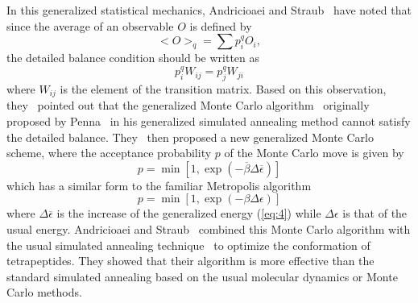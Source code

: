 In this generalized statistical mechanics, Andricioaei and 
Straub~\cite{AS1} have noted that since the average of an 
observable $O$ is defined by 
\begin{equation}
<O>_{q}=\sum p_{i}^{q}O_{i},
\label{eq:6}
\end{equation}
the detailed balance condition should be written as 
\begin{equation}
p_{i}^{q}W_{ij}=p_{j}^{q}W_{ji}
\label{equation}
\end{equation}
where $W_{ij}$ is the element of the transition matrix. Based 
on this observation, they~\cite{AS1} pointed out that the 
generalized Monte Carlo algorithm~\cite{TS} originally proposed 
by Penna~\cite{Pe} in his generalized simulated annealing method 
cannot satisfy the detailed balance.  They~\cite{AS1} then 
proposed a new generalized Monte Carlo scheme, where the 
acceptance probability $p$ of the Monte Carlo move is given by
\begin{equation}
p=\min\left[1,\exp(-\overline{\beta}\Delta \overline{\epsilon})\right] 
\label{eq:7}
\end{equation}
which has a similar form to the familiar Metropolis 
algorithm~\cite{MRRTT} 
\begin{equation}
p=\min\left[1,\exp(-\beta\Delta \epsilon)\right] \label{eq:8}
\end{equation}
where $\Delta\overline{\epsilon}$ is the increase of the 
generalized energy (\ref{eq:4}) while $\Delta\epsilon$ is that 
of the usual energy. Andricioaei and Straub~\cite{AS1} combined 
this Monte Carlo algorithm with the usual simulated annealing 
technique~\cite{KGV} to optimize the conformation of tetrapeptides.
They showed that their algorithm is more effective than the 
standard simulated annealing based on the usual molecular
dynamics or Monte Carlo methods.

